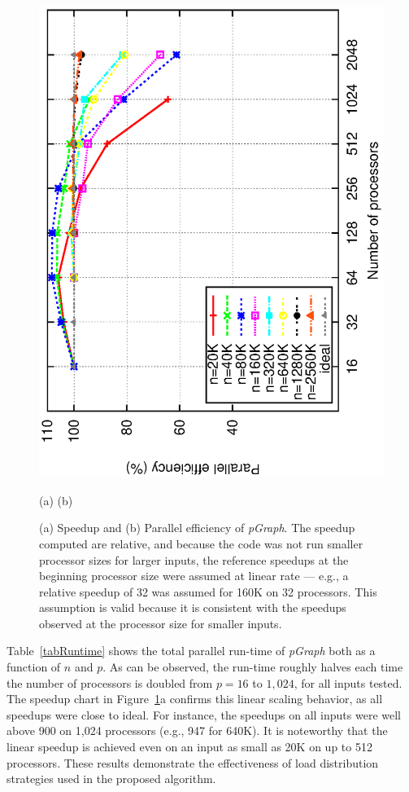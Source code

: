 \documentclass[10pt,journal,letterpaper,compsoc]{IEEEtran}
\begin{document}
\begin{figure}[t]
{            \includegraphics[angle=-90, scale=0.5]{efficiency.eps}
}
\centerline{(a) \hspace*{2.6in}(b)}
\caption{
(a) Speedup and (b) Parallel efficiency of {\it pGraph}. 
The speedup computed are relative, and because the code was not run smaller processor sizes for larger inputs, the reference speedups at the beginning processor size were assumed at linear rate --- e.g., a relative speedup of 32 was assumed for 160K on 32 processors. This assumption is valid because it is consistent with the speedups observed at the processor size for smaller inputs.
}
\label{figSpeedup}
\end{figure}

Table~\ref{tabRuntime} shows the total parallel run-time of {\it pGraph} both as a function of $n$ and $p$. As can be observed, the run-time roughly halves each time the number of processors is doubled from $p=16$ to $1,024$, for all inputs tested. The speedup chart in Figure~\ref{figSpeedup}a confirms this linear scaling behavior, as all speedups were close to ideal. For instance, the speedups on all inputs were well above 900 on 1,024 processors (e.g., 947 for 640K). It is noteworthy that the linear speedup is achieved even on an input as small as 20K on up to 512 processors. These results demonstrate the effectiveness of load distribution strategies used in the proposed algorithm.
\end{document}
